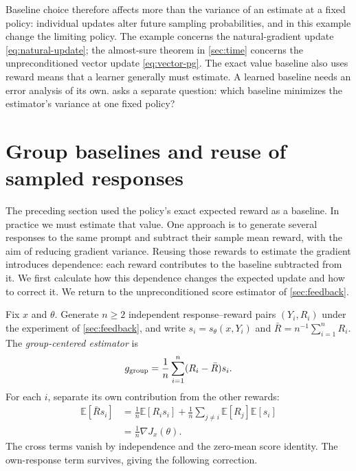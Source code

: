 \documentclass[11pt,twoside]{article}
\newcommand{\E}{\mathbb E}
\theoremstyle{definition}
\theoremstyle{remark}
\begin{document}
Baseline choice therefore affects more than the variance of an estimate
at a fixed policy: individual updates alter future sampling probabilities,
and in this example change the limiting policy. The example
concerns the natural-gradient update \cref{eq:natural-update}; the
almost-sure theorem in \cref{sec:time} concerns the unpreconditioned vector
update \cref{eq:vector-pg}. The exact value baseline also uses reward means
that a learner generally must estimate. A learned baseline needs an error
analysis of its own.  asks a separate question:
which baseline minimizes the estimator's variance at one fixed policy?

\section{Group baselines and reuse of sampled responses}
\label{sec:groups}

The preceding section used the policy's exact expected reward as a
baseline. In practice we must estimate that value. One approach is to
generate several responses to the same prompt and subtract their sample mean
reward, with the aim of reducing gradient variance. Reusing those rewards
to estimate the gradient introduces dependence: each reward contributes
to the baseline subtracted from it. We first calculate how this dependence
changes the expected update and how to correct it.
We return to the unpreconditioned score estimator of \cref{sec:feedback}.

Fix $x$ and $\theta$. Generate $n\ge2$ independent response--reward pairs
$(Y_i,R_i)$ under the experiment of \cref{sec:feedback}, and write
$s_i=s_\theta(x,Y_i)$ and $\bar R=n^{-1}\sum_{i=1}^n R_i$.
The \emph{group-centered estimator} is
\[
 g_{\rm group}=\frac1n\sum_{i=1}^n(R_i-\bar R)s_i.
\]
For each $i$, separate its own contribution from the other rewards:
\begin{align*}
 \E[\bar R s_i]
 &=\frac1n\E[R_i s_i]
   +\frac1n\sum_{j\ne i}\E[R_j]\E[s_i]\\
 &=\frac1n\nabla J_x(\theta).
\end{align*}
The cross terms vanish by independence and the zero-mean score identity.
The own-response term survives, giving the following correction.
\end{document}
